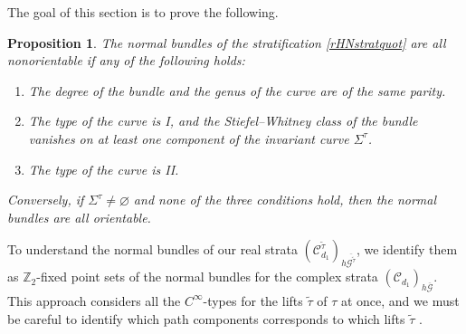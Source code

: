 \documentclass[10pt,a4paper]{amsart}
\numberwithin{equation}{section}
\newtheorem{Proposition}[Theorem]{Proposition}
\begin{document}
The goal of this section is to prove the following.

\begin{Proposition}\label{orientableProp}
The normal bundles of the stratification \eqref{rHNstratquot} are all nonorientable if any of the following holds:
\begin{enumerate}\itemsep=0pt
\item[$1.$] The degree of the bundle and the genus of the curve are of the same parity.
\item[$2.$] The type of the curve is I, and the Stiefel--Whitney class of the bundle vanishes on at least one component of the invariant curve $\Sigma^{\tau}$.
\item[$3.$] The type of the curve is II.
\end{enumerate}
Conversely, if $\Sigma^{\tau} \neq \varnothing$ and none of the three conditions hold, then the normal bundles are all orientable.
\end{Proposition}

To understand the normal bundles of our real strata $({\mathcal C}_{d_1}^{\tilde{\tau}})_{h\overline{{\mathcal G}^{\tilde{\tau}}}}$, we identify them as ${\mathbb Z}_2$-f\/ixed point sets of the normal bundles for the complex strata $ ({\mathcal C}_{d_1})_{{h\overline{{\mathcal G}}} }$. This approach considers all the $C^{\infty}$-types for the lifts $\tilde{\tau}$ of $\tau$ at once, and we must be careful to identify which path components corresponds to which lifts $\tilde{\tau}$ .
\end{document}
